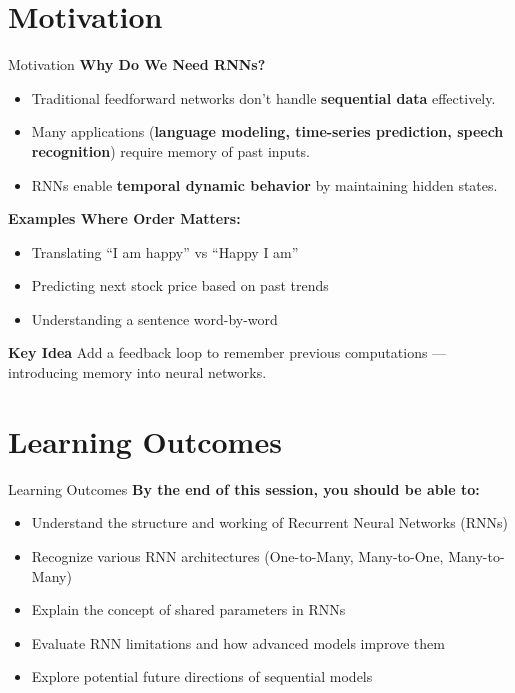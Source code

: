\section{Motivation}
\begin{frame}{Motivation}
    \textbf{Why Do We Need RNNs?}
    \begin{itemize}
        \item Traditional feedforward networks don’t handle \textbf{sequential data} effectively.
        \item Many applications (\textbf{language modeling, time-series prediction, speech recognition}) require memory of past inputs.
        \item RNNs enable \textbf{temporal dynamic behavior} by maintaining hidden states.
    \end{itemize}

    \textbf{Examples Where Order Matters:}
    \begin{itemize}
        \item Translating ``I am happy'' vs ``Happy I am''
        \item Predicting next stock price based on past trends
        \item Understanding a sentence word-by-word
    \end{itemize}

    \begin{block}{\textbf{Key Idea}}
        Add a feedback loop to remember previous computations --- introducing memory into neural networks.
    \end{block}
\end{frame}

\section{Learning Outcomes}
\begin{frame}{Learning Outcomes}
\textbf{By the end of this session, you should be able to:}
\begin{itemize}
    \item Understand the structure and working of Recurrent Neural Networks (RNNs)
    \item Recognize various RNN architectures (One-to-Many, Many-to-One, Many-to-Many)
    \item Explain the concept of shared parameters in RNNs
    \item Evaluate RNN limitations and how advanced models improve them
    \item Explore potential future directions of sequential models
\end{itemize}
\end{frame}


